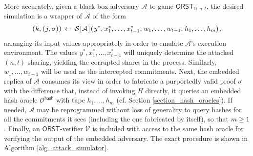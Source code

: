 \documentclass{iacrtrans}
\begin{document}
More accurately, given a black-box adversary $\mathcal{A}$
to game $\mathsf{ORST}_{\hspace{1pt}\mathbb{G}, n, t}$,
the desired simulation is a wrapper of $\mathcal{A}$ of the form
\vspace{5pt}
\begin{equation*}
	(
		\hspace{0.5pt}
		k,
		\hspace{0.5pt}
		(
			\hspace{0.5pt}
			j,
			\hspace{0.5pt}
			\sigma
		)
		\hspace{0.5pt}
	)
	\hspace{2pt}
	\leftarrow
	\hspace{2pt}
	\mathcal{S}
		\hspace{.5pt}
		[
			\hspace{0.5pt}
			\mathcal{A}
			\hspace{1pt}
		]
		\hspace{1pt}
		(
			\hspace{1pt}
			y ^*,
			\hspace{1pt}
			x_1^*, \dots, x_{t-1}^*,
			\hspace{1pt}
			w_1, \dots, w_{t-1};
			\hspace{1pt}
			h_1, \dots, h_m
		)\hspace{1pt},
\vspace{5pt}
\end{equation*}
arranging its input values appropriately
in order to emulate $\mathcal{A}$'s execution environment.
The values $y^*, x_1^*, \dots, x_{t-1}^*$
will uniquely determine the attacked $(n, t)$-sharing,
yielding the corrupted shares in the process.
Similarly, $w_1, \dots, w_{t-1}$ will be used
as the intercepted commitments.
Next, the embedded replica of $\mathcal{A}$
consumes its view in order to fabricate
a purportedly valid proof $\sigma$
with the difference that,
instead of invoking $H$ directly,
it queries an embedded hash oracle
$\mathcal{O}^{\mathsf{hash}}$
with tape $h_1, \dots, h_{m}$
(cf. Section \ref{section_hash_oracles}).
If needed, $\mathcal{A}$ may be reprogrammed
without loss of generality
to query hashes for all the commitments it sees
(including the one fabricated by itself),
so that $m \ge 1$.
Finally, an $\mathsf{ORST}$-verifier $\mathcal{V}$
is included with access to the same hash oracle for
verifying the output of the embedded adversary.
The exact procedure is shown in Algorithm \ref{alg_attack_simulator}.
\end{document}
